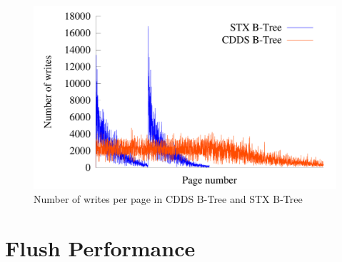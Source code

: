 \begin{figure}[t]
\begin{center}
\includegraphics[width=0.7\columnwidth]{figs/wear-line}
\caption{Number of writes per page in CDDS B-Tree and STX B-Tree}
\label{fig:wear-line}
\end{center}
\end{figure}



\section{Flush Performance}
\label{sec:flush_perf}

